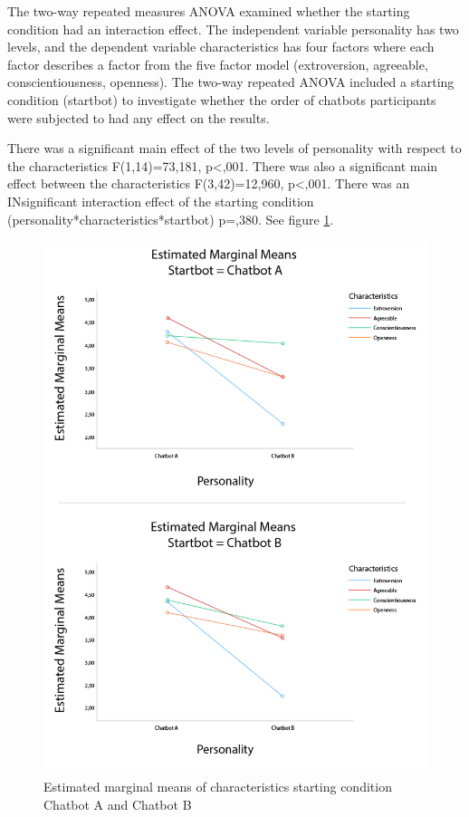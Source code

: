 The two-way repeated measures ANOVA examined whether the starting condition had an interaction effect. The independent variable personality has two levels, and the dependent variable characteristics has four factors where each factor describes a factor from the five factor model (extroversion, agreeable, conscientiousness, openness). The two-way repeated ANOVA included a starting condition (startbot) to investigate whether the order of chatbots participants were subjected to had any effect on the results.

There was a significant main effect of the two levels of personality with respect to the characteristics F(1,14)=73,181, p<,001. There was also a significant main effect between the characteristics F(3,42)=12,960, p<,001. There was an INsignificant interaction effect of the starting condition (personality*characteristics*startbot) p=,380. See figure \ref{fig:characstartAB}.

\begin{figure}[h]
    \centering
    \includegraphics[scale=0.4]{figures/MMeanStartbotABCharacteristics.png}
    \caption{Estimated marginal means of characteristics starting condition Chatbot A and Chatbot B}
    \label{fig:characstartAB}
\end{figure}


